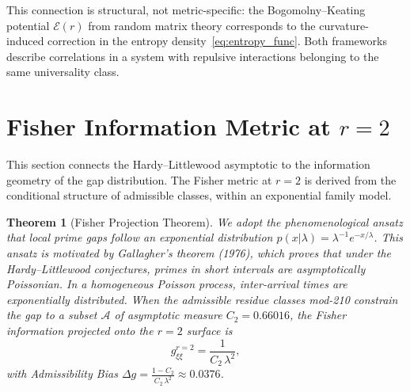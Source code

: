 \documentclass[12pt]{article}
\newtheorem{theorem}{Theorem}[section]
\begin{document}
This connection is structural, not metric-specific: the Bogomolny--Keating
potential $\mathcal{E}(r)$ from random matrix theory corresponds to the
curvature-induced correction in the entropy density~\eqref{eq:entropy_func}.
Both frameworks describe correlations in a system with repulsive interactions
belonging to the same universality class.

\section{Fisher Information Metric at $r=2$}

This section connects the Hardy--Littlewood asymptotic to the information
geometry of the gap distribution. The Fisher metric at $r=2$ is derived from
the conditional structure of admissible classes, within an exponential
family model.

\begin{theorem}[Fisher Projection Theorem]
We adopt the phenomenological ansatz that local prime gaps follow an exponential
distribution $p(x|\lambda) = \lambda^{-1} e^{-x/\lambda}$. This ansatz is motivated
by Gallagher's theorem (1976), which proves that under the Hardy--Littlewood
conjectures, primes in short intervals are asymptotically Poissonian. In a
homogeneous Poisson process, inter-arrival times are exponentially distributed.
When the admissible residue classes mod-210 constrain the gap to a subset
$\mathcal{A}$ of asymptotic measure $C_2 = 0.66016$, the Fisher information
projected onto the $r=2$ surface is
\begin{equation}
  g_{\xi\xi}^{r=2} = \frac{1}{C_2\,\lambda^2},
  \label{eq:fisher_r2}
\end{equation}
with Admissibility Bias $\Delta g = \frac{1 - C_2}{C_2\,\lambda^2} \approx 0.0376$.
\end{theorem}
\label{thm:fisher}
\end{document}
